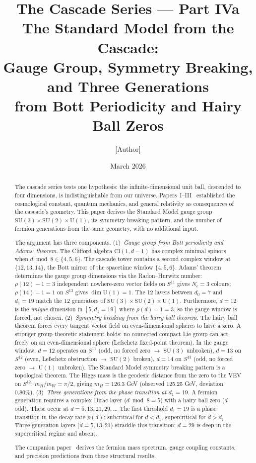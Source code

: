 \documentclass[12pt,a4paper]{article}
\title{The Cascade Series --- Part IVa\\[0.5em]
\large The Standard Model from the Cascade:\\
Gauge Group, Symmetry Breaking, and Three Generations\\
from Bott Periodicity and Hairy Ball Zeros}
\author{[Author]}
\date{March 2026}
\begin{document}
\maketitle

\begin{abstract}
The cascade series tests one hypothesis: the infinite-dimensional unit ball, descended to
four dimensions, is indistinguishable from our universe. Papers~I--III~\cite{paperI,paperII,paperIII}
established the cosmological constant, quantum mechanics, and general relativity as
consequences of the cascade's geometry. This paper derives the Standard Model gauge group
$\mathrm{SU}(3)\times\mathrm{SU}(2)\times\mathrm{U}(1)$, its symmetry breaking pattern,
and the number of fermion generations from the same geometry, with no additional input.

The argument has three components. (1)~\emph{Gauge group from Bott periodicity and Adams'
theorem.} The Clifford algebra $\mathrm{Cl}(1,d-1)$ has complex minimal spinors when
$d\bmod 8\in\{4,5,6\}$. The cascade tower contains a second complex window at $\{12,13,14\}$,
the Bott mirror of the spacetime window $\{4,5,6\}$. Adams' theorem determines the gauge
group dimensions via the Radon--Hurwitz number: $\rho(12)-1=3$ independent nowhere-zero
vector fields on $S^{11}$ gives $N_c=3$ colours; $\rho(14)-1=1$ on $S^{13}$ gives
$\dim\mathrm{U}(1)=1$. The 12 layers between $d_0=7$ and $d_1=19$ match the 12 generators
of $\mathrm{SU}(3)\times\mathrm{SU}(2)\times\mathrm{U}(1)$. Furthermore, $d=12$ is the
\emph{unique} dimension in $[5,d_1=19]$ where $\rho(d)-1=3$, so the gauge window is
forced, not chosen. (2)~\emph{Symmetry breaking from the hairy ball theorem.} The hairy
ball theorem forces every tangent vector field on even-dimensional spheres to have a zero.
A stronger group-theoretic statement holds: no connected compact Lie group can act freely
on an even-dimensional sphere (Lefschetz fixed-point theorem). In the gauge window:
$d=12$ operates on $S^{11}$ (odd, no forced zero $\to$ $\mathrm{SU}(3)$ unbroken), $d=13$
on $S^{12}$ (even, Lefschetz obstruction $\to$ $\mathrm{SU}(2)$ broken), $d=14$ on
$S^{13}$ (odd, no forced zero $\to$ $\mathrm{U}(1)$ unbroken). The Standard Model
symmetry breaking pattern is a topological theorem. The Higgs mass is the geodesic
distance from the zero to the VEV on $S^{12}$: $m_H/m_W=\pi/2$, giving $m_H=126.3$ GeV
(observed 125.25 GeV, deviation 0.80\%). (3)~\emph{Three generations from the phase
transition at $d_1=19$.} A fermion generation requires a complex Dirac layer ($d\bmod 8=5$)
with a hairy ball zero ($d$ odd). These occur at $d=5,13,21,29,\ldots$ The first threshold
$d_1=19$ is a phase transition in the decay rate $p(d)$: subcritical for $d<d_1$,
supercritical for $d>d_1$. Three generation layers ($d=5,13,21$) straddle this transition;
$d=29$ is deep in the supercritical regime and absent.

The companion paper~\cite{paperIVb} derives the fermion mass spectrum, gauge coupling
constants, and precision predictions from these structural results.
\end{abstract}
\end{document}
